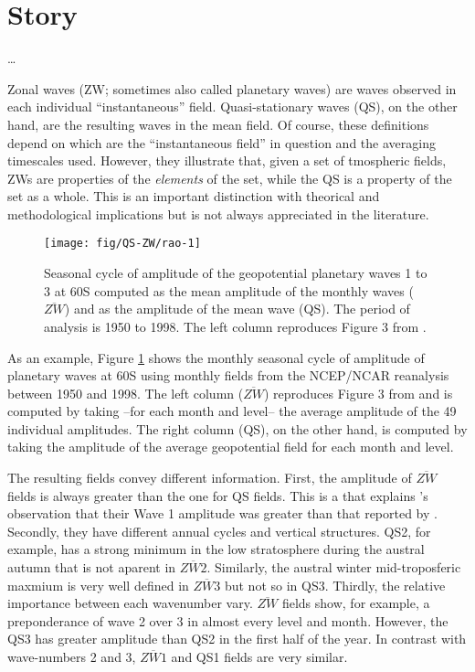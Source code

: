 \documentclass[draft,linenumbers]{agujournal2018}
\begin{document}
\section{Story}

\ldots{}

Zonal waves (ZW; sometimes also called planetary waves) are waves
observed in each individual ``instantaneous'' field. Quasi-stationary
waves (QS), on the other hand, are the resulting waves in the mean
field. Of course, these definitions depend on which are the
``instantaneous field'' in question and the averaging timescales used.
However, they illustrate that, given a set of tmospheric fields, ZWs are
properties of the \emph{elements} of the set, while the QS is a property
of the set as a whole. This is an important distinction with theorical
and methodological implications but is not always appreciated in the
literature.

\begin{figure}[h]
\texttt{[image: fig/QS-ZW/rao-1]} \caption{Seasonal cycle of amplitude of the geopotential planetary waves 1 to 3 at 60\degree S computed as the mean amplitude of the monthly waves ($\overline{ZW}$) and as the amplitude of the mean wave (QS). The period of analysis is 1950 to 1998. The left column reproduces Figure 3 from \citet{Rao2004}.}\label{fig:rao}
\end{figure}

As an example, Figure \ref{fig:rao} shows the monthly seasonal cycle of
amplitude of planetary waves at 60\degree S using monthly fields from
the NCEP/NCAR reanalysis \citep{Kalnay1996} between 1950 and 1998. The
left column (\(\overline{ZW}\)) reproduces Figure 3 from \citet{Rao2004}
and is computed by taking --for each month and level-- the average
amplitude of the 49 individual amplitudes. The right column (QS), on the
other hand, is computed by taking the amplitude of the average
geopotential field for each month and level.

The resulting fields convey different information. First, the amplitude
of \(\overline{ZW}\) fields is always greater than the one for QS
fields. This is a
that explains \citet{Rao2004}'s observation that their Wave 1 amplitude
was greater than that reported by \citet{Hurrell1998}. Secondly, they
have different annual cycles and vertical structures. QS2, for example,
has a strong minimum in the low stratosphere during the austral autumn
that is not aparent in \(\overline{ZW2}\). Similarly, the austral winter
mid-troposferic maxmium is very well defined in \(\overline{ZW3}\) but
not so in QS3. Thirdly, the relative importance between each wavenumber
vary. \(\overline{ZW}\) fields show, for example, a preponderance of
wave 2 over 3 in almost every level and month. However, the QS3 has
greater amplitude than QS2 in the first half of the year. In contrast
with wave-numbers 2 and 3, \(\overline{ZW1}\) and QS1 fields are very
similar.
\end{document}

